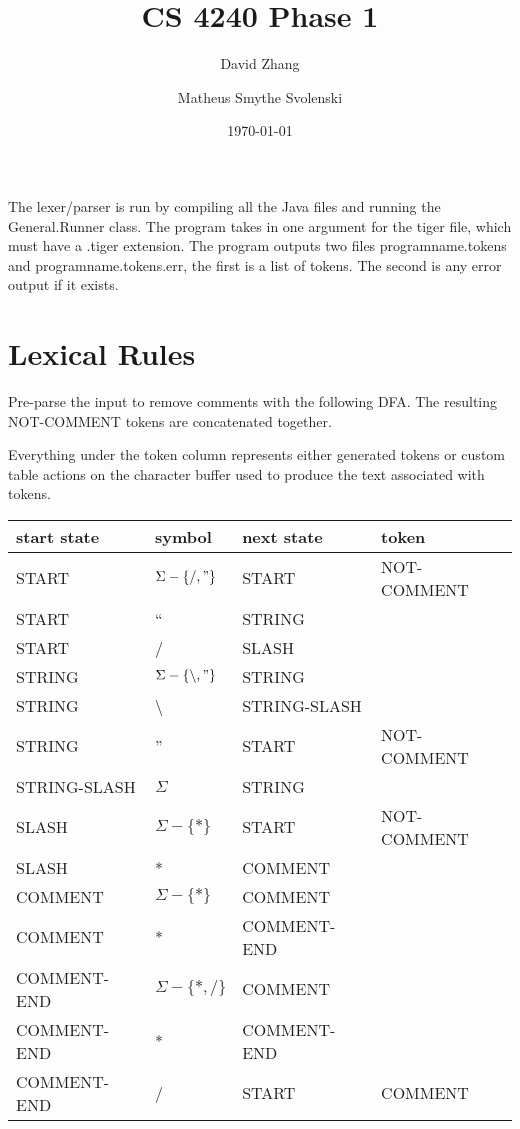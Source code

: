 \documentclass[11pt, fleqn]{article}
\begin{document}
\title{CS 4240 Phase 1}
\author{David Zhang \and Matheus Smythe Svolenski}
\date{\today}

\newtheorem{Lemma}{Lemma}
\newtheorem{Theorem}{Theorem}
\maketitle

The lexer/parser is run by compiling all the Java files and running the General.Runner class.
The program takes in one argument for the tiger file, which must have a .tiger extension.
The program outputs two files programname.tokens and programname.tokens.err, the first is a list of tokens.
The second is any error output if it exists.

\section{Lexical Rules}

Pre-parse the input to remove comments with the following DFA. The resulting NOT-COMMENT tokens are concatenated together.

Everything under the token column represents either generated tokens or custom table actions on the character buffer used to produce the text associated with tokens.

\begin{longtable}{l|l|l|l}
start state		&	symbol							&	next	 state		&	token		 	\\
\hline
START			&	$\Sigma - \{/, "\}$				& 	START			&	NOT-COMMENT		\\
START			&	``								& 	STRING			&					\\
START			&	/								&	SLASH			&					\\
STRING			&	$\Sigma - \{\backslash, "\}$		& 	STRING			&					\\
STRING			&	\textbackslash					& 	STRING-SLASH		&					\\
STRING			&	''								& 	START			&	NOT-COMMENT		\\
STRING-SLASH		&	$\Sigma$							&	STRING			&					\\
SLASH			&	$\Sigma - \{*\}$					&	START			&	NOT-COMMENT		\\
SLASH			&	*								&	COMMENT			&					\\
COMMENT			&	$\Sigma - \{*\}$					&	COMMENT			&					\\
COMMENT			&	*								&	COMMENT-END		&					\\
COMMENT-END		&	$\Sigma - \{*, /\}$				&	COMMENT			&					\\
COMMENT-END		&	*								&	COMMENT-END		&					\\
COMMENT-END		&	/								&	START			&	COMMENT			\\
\end{longtable}
\end{document}
